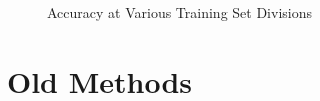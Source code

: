 \documentclass[10pt,parskip=half,
toc=sectionentrywithdots,
bibliography=totocnumbered,
captions=tableheading,numbers=noendperiod]{scrartcl}
\begin{document}
\begin{figure}[H]\begin{center}\end{center}\caption{Accuracy at Various Training Set Divisions}\label{fig:flabel}\end{figure}

\hypertarget{old-methods}{%
\section{Old Methods}\label{old-methods}}
\end{document}
